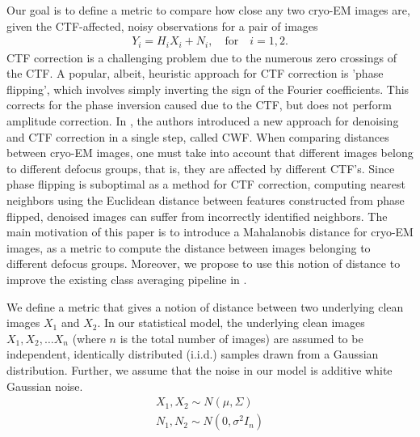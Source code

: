 \documentclass{article}
\begin{document}
Our goal is to define a metric to compare how close any two cryo-EM images are, given the CTF-affected, noisy observations for a pair of images
\begin{eqnarray} 
Y_i=H_i X_i + N_i, \quad \text{for} \quad i=1,2 .
\end{eqnarray}
CTF correction is a challenging problem due to the numerous zero crossings of the CTF. A popular, albeit, heuristic approach for CTF correction is 'phase flipping', which involves simply inverting the sign of the Fourier coefficients. This corrects for the phase inversion caused due to the CTF, but does not perform amplitude correction. In \cite{cwf}, the authors introduced a new approach for denoising and CTF correction in a single step, called CWF. When comparing distances between cryo-EM images, one must take into account that different images belong to different defocus groups, that is, they are affected by different CTF's. Since phase flipping is suboptimal as a method for CTF correction, computing nearest neighbors using the Euclidean distance between features constructed from phase flipped, denoised images can
 suffer from incorrectly identified neighbors. The main motivation of this paper is to introduce a Mahalanobis distance for cryo-EM images, as a metric to compute the distance between images belonging to different defocus groups. Moreover, we propose to use this notion of distance to improve the existing class averaging pipeline in \cite{zhao1}.

We define a metric that gives a notion of distance between two underlying clean images $X_1$ and $X_2$. In our statistical model, the underlying clean images $X_1, X_2, \ldots X_n$ (where $n$ is the total number of images) are assumed to be independent, identically distributed (i.i.d.) samples drawn from a Gaussian distribution. Further, we assume that the noise in our model is additive white Gaussian noise.
\begin{eqnarray} 
X_1, X_2  \sim N( {\mu},\Sigma) \nonumber \\ 
N_1, N_2  \sim N(0,{\sigma}^2 I_n )
\end{eqnarray}
\end{document}
